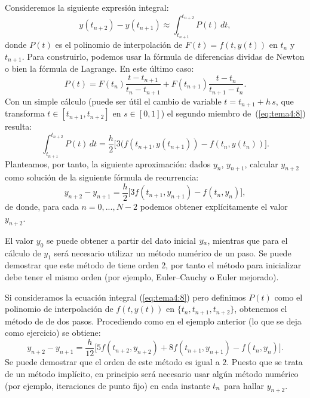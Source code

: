 \begin{example}
  \label{sec:AB-dos-pasos}
  Consideremos la siguiente expresión integral:
  \begin{equation}
   \label{eq:tema4:8} 
   y(t_{n+2})-y(t_{n+1}) \approx \int_{t_{n+1}}^{t_{n+2}} P(t)\,dt,
  \end{equation}
  donde $P(t)$ es el polinomio de interpolación de $F(t)=f(t,y(t))$ en
  $t_n$ y $t_{n+1}$. Para construirlo, podemos usar la fórmula de
  diferencias dividas de Newton o bien la fórmula de Lagrange. En este
  último caso:
  \begin{equation*}
   P(t)=F(t_n)\frac{t-t_{n+1}}{t_n-t_{n+1}} +
   F(t_{n+1})\frac{t-t_{n}}{t_{n+1}-t_{n}}.
  \end{equation*}
  Con un simple cálculo (puede ser útil el cambio de variable $t =
  t_{n+1}+h\,s$, que transforma $t\in [t_{n+1},t_{n+2}]$ en $s\in [0,1]$)
  el segundo miembro de~(\ref{eq:tema4:8}) resulta:
  \begin{equation*}
  \int_{t_{n+1}}^{t_{n+2}} P(t)\,dt = \frac{h}{2} \big[
  3(f(t_{n+1},y(t_{n+1})) - f(t_{n},y(t_{n})) \big].
  \end{equation*}
  Planteamos, por tanto, la siguiente aproximación: dados $y_n$,
  $y_{n+1}$, calcular $y_{n+2}$ como solución de la
  siguiente fórmula de recurrencia:
  \begin{equation}
    \tag{AB2}
    \label{eq:AB2}
    y_{n+2}-y_{n+1} = \frac{h}{2} \big[
    3f(t_{n+1},y_{n+1}) - f(t_{n},y_{n}) \big],
  \end{equation} 
  de donde, para cada $n=0,...,N-2$ podemos obtener explícitamente el
  valor $y_{n+2}$.
  
  El valor $y_0$ se puede obtener a partir del dato inicial ${y_a}$,
  mientras que para el cálculo de $y_1$ será necesario utilizar un
  método numérico de un paso. Se puede demostrar que este método
  de \AB tiene orden 2, por tanto el método para inicializar debe
  tener el mismo orden (por ejemplo, Euler--Cauchy o Euler mejorado).
\end{example}

\begin{example}
  Si consideramos la ecuación integral (\ref{eq:tema4:8}) pero
  definimos $P(t)$ como el polinomio de interpolación de
  $f(t,y(t))$ en $\{t_n,t_{n+1},t_{n+2}\}$, obtenemos el método
  de \AM de dos pasos. Procediendo como en el ejemplo anterior (lo que
  se deja como ejercicio) se obtiene:
  \begin{equation}
    \tag{AM2}
    \label{eq:AM2}
      y_{n+2}-y_{n+1} = \frac{h}{12} \big[
      5f(t_{n+2},y_{n+2}) + 8 f(t_{n+1},y_{n+1}) - f(t_{n},y_{n}) \big].
  \end{equation} 
  Se puede demostrar que el orden de este método es igual a
  $2$. Puesto que se trata de un método implícito, en principio será
  necesario usar algún método numérico (por ejemplo, iteraciones de
  punto fijo) en cada instante ${t_n}$ para hallar $y_{n+2}$. 
\end{example}

